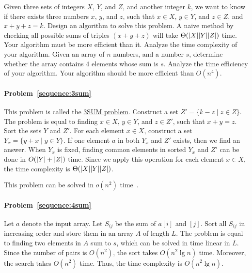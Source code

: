 \begin{Exercise}
\Question Given three sets of integers $X$, $Y$, and $Z$, and another integer $k$, we want to know if there exists three numbers $x$, $y$, and $z$, such that $x \in X$, $y \in Y$, and $z \in Z$, and $x + y + z = k$. Design an algorithm to solve this problem. A naive method by checking all possible sums of triples $(x+y+z)$ will take $\Theta(\lvert X\rvert\lvert Y\rvert\lvert Z\rvert)$ time. Your algorithm must be more efficient than it. Analyze the time complexity of your algorithm. \label{sequence:3sum} 
\Question Given an array of $n$ numbers, and a number $s$, determine whether the array contains $4$ elements whose sum is $s$. Analyze the time efficiency of your algorithm. Your algorithm should be more efficient than $O(n^4)$.  \label{sequence:4sum}  
\end{Exercise}
\begin{Answer}
\paragraph{Problem~\ref{sequence:3sum}} 
This problem is called the \href{https://en.wikipedia.org/wiki/3SUM}{3SUM problem}. Construct a set $Z' = \{k - z \mid z \in Z\}$. The problem is equal to finding $x \in X$, $y \in Y$, and $z \in Z'$, such that $x + y = z$. Sort the sets $Y$ and $Z'$. For each element $x \in X$, construct a set $Y_x = \{y + x \mid y \in Y\}$. If one element $a$ in both  $Y_x$ and $Z'$ exists, then we find an answer. When $Y_x$ is fixed, finding common elements in sorted $Y_x$ and $Z'$ can be done in $O(\lvert Y\rvert+\lvert Z\rvert)$ time. Since we apply this operation for each element $x \in X$, the time complexity is $\Theta(\lvert X\rvert\lvert Y\rvert\lvert Z\rvert)$.

\begin{remark}
This problem can be solved in $o(n^2)$ time~\cite{Jorgensen2014}.
\end{remark}

\paragraph{Problem~\ref{sequence:4sum}} Let $a$ denote the input array. Let $S_{ij}$ be the sum of $a[i]$ and $[j]$. Sort all $S_{ij}$ in increasing order and store them in an array $A$ of length $L$. The problem is equal to finding two elements in $A$ sum to $s$, which can be solved in time linear in $L$. Since the number of pairs is $O(n^2)$, the sort takes $O(n^2 \lg n)$ time. Moreover, the search takes $O(n^2)$ time. Thus, the time complexity is $O(n^2 \lg n)$.
\end{Answer}

